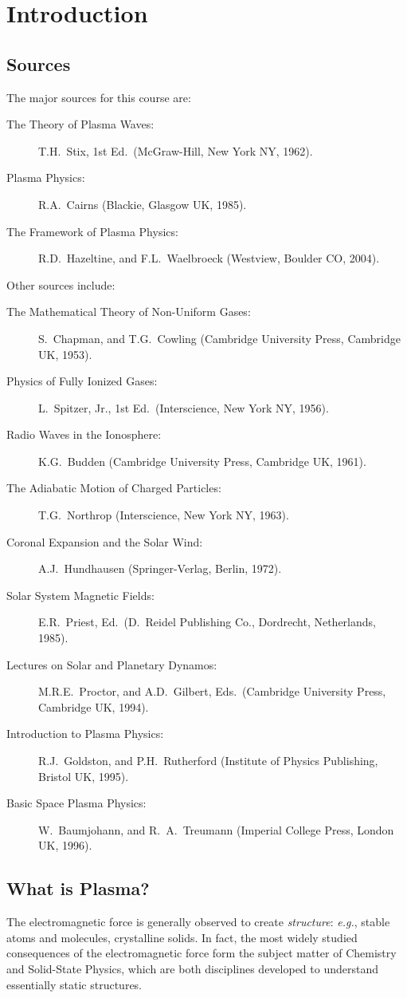 \chapter{Introduction}\label{s1}

\section{Sources}
The major sources for this course are:
\begin{description}
\item [{\sf The Theory of Plasma Waves}:] T.H.~Stix, 1st Ed.\ (McGraw-Hill,
New York NY, 1962). 
\item [{\sf Plasma Physics}:] R.A.~Cairns (Blackie, Glasgow UK, 1985).
\item [{\sf The Framework of Plasma Physics}:] R.D.~Hazeltine, and F.L.~Waelbroeck (Westview,
Boulder CO, 2004).
\end{description}
Other sources include:
\begin{description}
\item [{\sf The Mathematical Theory of Non-Uniform Gases}:] S.~Chapman, and
T.G.~Cowling (Cambridge University Press, Cambridge UK, 1953).
\item [{\sf Physics of Fully Ionized Gases}:] L.~Spitzer, Jr., 1st Ed.\
(Interscience, New York NY, 1956).
\item [{\sf Radio Waves in the Ionosphere}:] K.G.~Budden (Cambridge University Press,
Cambridge UK, 1961). 
\item [{\sf The Adiabatic Motion of Charged Particles}:] T.G.~Northrop 
(Interscience, New York NY, 1963).
\item [{\sf Coronal Expansion and the Solar Wind}:] A.J.~Hundhausen (Springer-Verlag,
Berlin, 1972).
\item [{\sf Solar System Magnetic Fields}:] E.R.~Priest, Ed.\ (D.~Reidel
Publishing Co., Dordrecht, Netherlands, 1985).
\item [{\sf Lectures on Solar and Planetary Dynamos}:] M.R.E.~Proctor,
and A.D.~Gilbert, Eds.\ (Cambridge University Press,
Cambridge UK, 1994). 
\item [{\sf Introduction to Plasma Physics}:] R.J.~Goldston, and P.H.~Rutherford
(Institute of Physics Publishing, Bristol UK, 1995).
\item [{\sf Basic Space Plasma Physics}:] W.~Baumjohann, and R.~A.~Treumann
(Imperial College Press, London UK, 1996). 
\end{description}

\section{What is Plasma?}
The electromagnetic force is generally observed to create {\em structure}: 
{\em e.g.},
stable atoms and molecules, crystalline solids. In fact, the most widely studied
consequences of  the electromagnetic force form the subject matter of 
Chemistry and Solid-State
Physics, which are both disciplines developed to understand essentially static
structures. 

